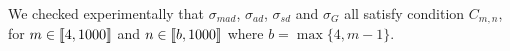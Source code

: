\begin{remark}
	\label{prop:spreadMeas}
	We checked experimentally that $\sigma_{mad}$, $\sigma_{ad}$, $\sigma_{sd}$ and $\sigma_{G}$ all satisfy condition $C_{m,n}$, for $m \in \llbracket4,1000\rrbracket$ and $n \in \llbracket b, 1000\rrbracket$ where $b = \max\{4,m-1\}$.
\end{remark}

%
%	
%	
%	
%	
